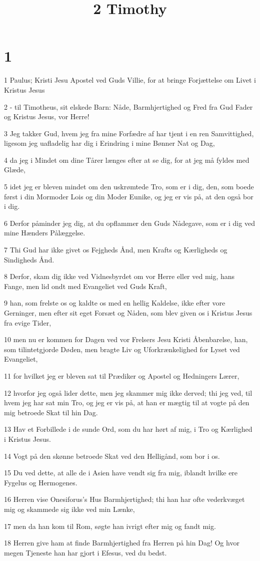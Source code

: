 

\title{2 Timothy}


\chapter{1}

\par 1 Paulus; Kristi Jesu Apostel ved Guds Villie, for at bringe Forjættelse om Livet i Kristus Jesus
\par 2 - til Timotheus, sit elskede Barn: Nåde, Barmhjertighed og Fred fra Gud Fader og Kristus Jesus, vor Herre!
\par 3 Jeg takker Gud, hvem jeg fra mine Forfædre af har tjent i en ren Samvittighed, ligesom jeg uafladelig har dig i Erindring i mine Bønner Nat og Dag,
\par 4 da jeg i Mindet om dine Tårer længes efter at se dig, for at jeg må fyldes med Glæde,
\par 5 idet jeg er bleven mindet om den uskrømtede Tro, som er i dig, den, som boede først i din Mormoder Lois og din Moder Eunike, og jeg er vis på, at den også bor i dig.
\par 6 Derfor påminder jeg dig, at du opflammer den Guds Nådegave, som er i dig ved mine Hænders Pålæggelse.
\par 7 Thi Gud har ikke givet os Fejgheds Ånd, men Krafts og Kærligheds og Sindigheds Ånd.
\par 8 Derfor, skam dig ikke ved Vidnesbyrdet om vor Herre eller ved mig, hans Fange, men lid ondt med Evangeliet ved Guds Kraft,
\par 9 han, som frelste os og kaldte os med en hellig Kaldelse, ikke efter vore Gerninger, men efter sit eget Forsæt og Nåden, som blev given os i Kristus Jesus fra evige Tider,
\par 10 men nu er kommen for Dagen ved vor Frelsers Jesu Kristi Åbenbarelse, han, som tilintetgjorde Døden, men bragte Liv og Uforkrænkelighed for Lyset ved Evangeliet,
\par 11 for hvilket jeg er bleven sat til Prædiker og Apostel og Hedningers Lærer,
\par 12 hvorfor jeg også lider dette, men jeg skammer mig ikke derved; thi jeg ved, til hvem jeg har sat min Tro, og jeg er vis på, at han er mægtig til at vogte på den mig betroede Skat til hin Dag.
\par 13 Hav et Forbillede i de sunde Ord, som du har hørt af mig, i Tro og Kærlighed i Kristus Jesus.
\par 14 Vogt på den skønne betroede Skat ved den Helligånd, som bor i os.
\par 15 Du ved dette, at alle de i Asien have vendt sig fra mig, iblandt hvilke ere Fygelus og Hermogenes.
\par 16 Herren vise Onesiforus's Hus Barmhjertighed; thi han har ofte vederkvæget mig og skammede sig ikke ved min Lænke,
\par 17 men da han kom til Rom, søgte han ivrigt efter mig og fandt mig.
\par 18 Herren give ham at finde Barmhjertighed fra Herren på hin Dag! Og hvor megen Tjeneste han har gjort i Efesus, ved du bedst.

